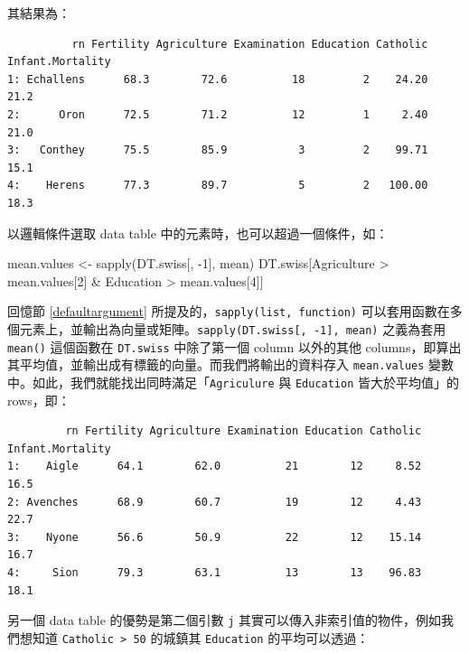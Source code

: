 \documentclass[
]{book}
\newenvironment{Shaded}{\begin{snugshade}}{\end{snugshade}}
\newcommand{\DecValTok}[1]{\textcolor[rgb]{0.00,0.00,0.81}{#1}}
\newcommand{\FunctionTok}[1]{\textcolor[rgb]{0.00,0.00,0.00}{#1}}
\newcommand{\NormalTok}[1]{#1}
\newcommand{\OtherTok}[1]{\textcolor[rgb]{0.56,0.35,0.01}{#1}}
\newcommand{\SpecialCharTok}[1]{\textcolor[rgb]{0.00,0.00,0.00}{#1}}
\theoremstyle{definition}
\theoremstyle{remark}
\begin{document}
其結果為：

\begin{verbatim}
          rn Fertility Agriculture Examination Education Catholic Infant.Mortality
1: Echallens      68.3        72.6          18         2    24.20             21.2
2:      Oron      72.5        71.2          12         1     2.40             21.0
3:   Conthey      75.5        85.9           3         2    99.71             15.1
4:    Herens      77.3        89.7           5         2   100.00             18.3
\end{verbatim}

以邏輯條件選取 data table 中的元素時，也可以超過一個條件，如：

\begin{Shaded}
\begin{Highlighting}[]
\NormalTok{mean.values }\OtherTok{\textless{}{-}} \FunctionTok{sapply}\NormalTok{(DT.swiss[, }\SpecialCharTok{{-}}\DecValTok{1}\NormalTok{], mean)}
\NormalTok{DT.swiss[Agriculture }\SpecialCharTok{\textgreater{}}\NormalTok{ mean.values[}\DecValTok{2}\NormalTok{] }\SpecialCharTok{\&}\NormalTok{ Education }\SpecialCharTok{\textgreater{}}\NormalTok{ mean.values[}\DecValTok{4}\NormalTok{]]}
\end{Highlighting}
\end{Shaded}

回憶節 \ref{defaultargument} 所提及的，\texttt{sapply(list,\ function)} 可以套用函數在多個元素上，並輸出為向量或矩陣。\texttt{sapply(DT.swiss{[},\ -1{]},\ mean)} 之義為套用 \texttt{mean()} 這個函數在 \texttt{DT.swiss} 中除了第一個 column 以外的其他 columns，即算出其平均值，並輸出成有標籤的向量。而我們將輸出的資料存入 \texttt{mean.values} 變數中。如此，我們就能找出同時滿足「\texttt{Agriculure} 與 \texttt{Education} 皆大於平均值」的 rows，即：

\begin{verbatim}
         rn Fertility Agriculture Examination Education Catholic Infant.Mortality
1:    Aigle      64.1        62.0          21        12     8.52             16.5
2: Avenches      68.9        60.7          19        12     4.43             22.7
3:    Nyone      56.6        50.9          22        12    15.14             16.7
4:     Sion      79.3        63.1          13        13    96.83             18.1
\end{verbatim}

另一個 data table 的優勢是第二個引數 \texttt{j} 其實可以傳入非索引值的物件，例如我們想知道 \texttt{Catholic\ \textgreater{}\ 50} 的城鎮其 \texttt{Education} 的平均可以透過：
\end{document}
